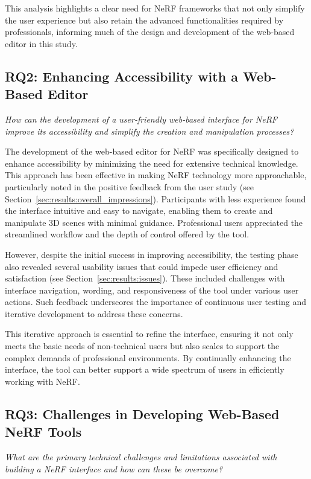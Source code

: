 This analysis highlights a clear need for NeRF frameworks that not only simplify the user experience but also retain the advanced functionalities required by professionals, informing much of the design and development of the web-based editor in this study.

\subsection*{RQ2: Enhancing Accessibility with a Web-Based Editor}

\emph{How can the development of a user-friendly web-based interface for NeRF improve its accessibility and simplify the creation and manipulation processes?}

The development of the web-based editor for NeRF was specifically designed to enhance accessibility by minimizing the need for extensive technical knowledge.
This approach has been effective in making NeRF technology more approachable, particularly noted in the positive feedback from the user study (see Section~\ref{sec:results:overall_impressions}).
Participants with less experience found the interface intuitive and easy to navigate, enabling them to create and manipulate 3D scenes with minimal guidance.
Professional users appreciated the streamlined workflow and the depth of control offered by the tool.

However, despite the initial success in improving accessibility, the testing phase also revealed several usability issues that could impede user efficiency and satisfaction (see Section~\ref{sec:results:issues}).
These included challenges with interface navigation, wording, and responsiveness of the tool under various user actions.
Such feedback underscores the importance of continuous user testing and iterative development to address these concerns.

This iterative approach is essential to refine the interface, ensuring it not only meets the basic needs of non-technical users but also scales to support the complex demands of professional environments.
By continually enhancing the interface, the tool can better support a wide spectrum of users in efficiently working with NeRF.

\subsection*{RQ3: Challenges in Developing Web-Based NeRF Tools}
\emph{What are the primary technical challenges and limitations associated with building a NeRF interface and how can these be overcome?}

